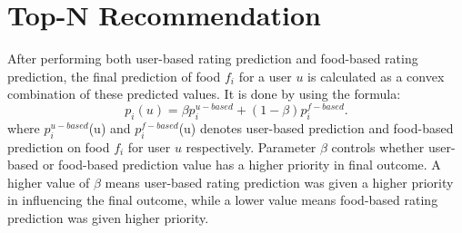 \section{Top-N Recommendation}
After performing both user-based rating prediction and food-based rating prediction, the final prediction of food $f_i$ for a user $u$ is calculated as a convex combination of these predicted values\cite*{9775081, oulu_tdlgc}. It is done by using the formula:
\begin{equation*}
    p_{i}\left({u}\right)=\beta p_{i}^{u-based}+\left({1-\beta }\right) p_{i}^{f-based}. \tag{7}
\end{equation*}
where $p_i^{u-based}$(u) and $p_i^{f-based}$(u) denotes user-based prediction and food-based prediction on food $f_i$ for user $u$ respectively\cite*{9775081, oulu_tdlgc}. Parameter $\beta$ controls whether user-based or food-based prediction value has a higher priority in final outcome. A higher value of $\beta$ means user-based rating prediction was given a higher priority in influencing the final outcome, while a lower value means food-based rating prediction was given higher priority.
